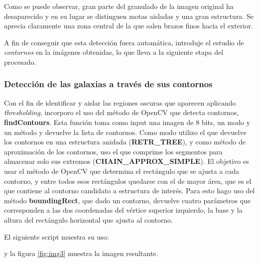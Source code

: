 \documentclass[a4paper,12pt]{article}
\begin{document}
Como se puede observar, gran parte del granulado de la imagen original ha desaparecido y en su lugar se distinguen motas aisladas y una gran estructura. Se aprecia claramente una zona central de la que salen brazos finos hacia el exterior.

A fin de conseguir que esta detección fuera automática, introduje el estudio de \textit{contornos} en la imágenes obtenidas, lo que lleva a la siguiente etapa del procesado.

\subsubsection{Detección de las galaxias a través de sus contornos}
Con el fin de identificar y aislar las regiones oscuras que aparecen aplicando \textit{thresholding}, incorporo el uso del método de OpenCV que detecta contornos, \textbf{findContours}\cite{findcontours}. Esta función toma como input una imagen de 8 bits, un modo y un método y devuelve la lista de contornos. Como modo utilizo el que devuelve los contornos en una estructura anidada (\textbf{RETR\_TREE}), y como método de aproximación de los contornos, uso el que comprime los segmentos para almacenar solo sus extremos (\textbf{CHAIN\_APPROX\_SIMPLE}). El objetivo es usar el método de OpenCV que determina el rectángulo que se ajusta a cada contorno, y entre todos esos rectángulos quedarse con el de mayor área, que es el que contiene al contorno candidato a estructura de interés. Para esto hago uso del método \textbf{boundingRect}\cite{boundingrect}, que dado un contorno, devuelve cuatro parámetros que corresponden a las dos coordenadas del vértice superior izquierdo, la base y la altura del rectángulo horizontal que ajusta al contorno.


El siguiente script muestra su uso:

y la figura \ref{fig:img3} muestra la imagen resultante.
\end{document}
